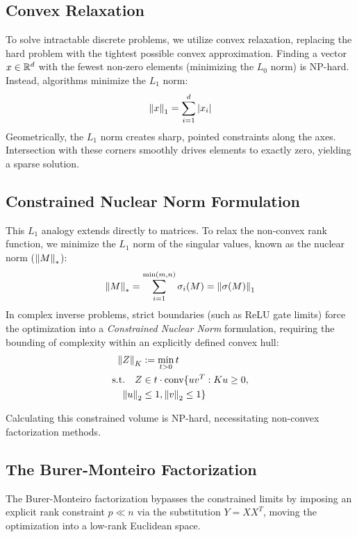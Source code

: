 \subsection{Convex Relaxation}
To solve intractable discrete problems, we utilize convex relaxation, replacing the hard problem with the tightest possible convex approximation. Finding a vector $x \in \mathbb{R}^d$ with the fewest non-zero elements (minimizing the $L_0$ norm) is NP-hard. Instead, algorithms minimize the $L_1$ norm:
\begin{equation}
\left\lVert x\right\rVert_1 = \sum_{i=1}^d |x_i|
\end{equation}
Geometrically, the $L_1$ norm creates sharp, pointed constraints along the axes. Intersection with these corners smoothly drives elements to exactly zero, yielding a sparse solution.

\subsection{Constrained Nuclear Norm Formulation}
This $L_1$ analogy extends directly to matrices. To relax the non-convex rank function, we minimize the $L_1$ norm of the singular values, known as the nuclear norm ($\left\lVert M\right\rVert_*$):
\begin{equation}
\left\lVert M\right\rVert_* = \sum_{i=1}^{\min(m,n)} \sigma_i(M) = \left\lVert\sigma(M)\right\rVert_1
\end{equation}
In complex inverse problems, strict boundaries (such as ReLU gate limits) force the optimization into a \textit{Constrained Nuclear Norm} formulation, requiring the bounding of complexity within an explicitly defined convex hull:
\begin{align}
\left\lVert Z\right\rVert_K &:= \min_{t>0} t \nonumber \\
\text{s.t.} \quad Z &\in t \cdot \text{conv}\{uv^T : Ku \ge 0, \nonumber \\
 \left\lVert u\right\rVert_2 &\le 1, \left\lVert v\right\rVert_2 \le 1\} 
\end{align}

Calculating this constrained volume is NP-hard, necessitating non-convex factorization methods.

\subsection{The Burer-Monteiro Factorization}
The Burer-Monteiro factorization bypasses the constrained limits by imposing an explicit rank constraint $p \ll n$ via the substitution $Y = XX^T$, moving the optimization into a low-rank Euclidean space. 

